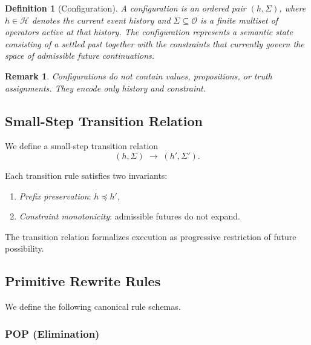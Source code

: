 \documentclass[11pt]{article}
\newtheorem{definition}{Definition}
\newtheorem{remark}{Remark}
\begin{document}
\begin{definition}[Configuration]
A configuration is an ordered pair $(h, \Sigma)$, where $h \in \mathcal{H}$
denotes the current event history and $\Sigma \subseteq \mathcal{O}$ is a finite
multiset of operators active at that history. The configuration represents a
semantic state consisting of a settled past together with the constraints that
currently govern the space of admissible future continuations.
\end{definition}


\begin{remark}
Configurations do not contain values, propositions, or truth assignments. They
encode only history and constraint.
\end{remark}

\subsection{Small-Step Transition Relation}

We define a small-step transition relation
\[
(h, \Sigma) \;\longrightarrow\; (h', \Sigma').
\]

Each transition rule satisfies two invariants:
\begin{enumerate}
\item \emph{Prefix preservation}: $h \preceq h'$,
\item \emph{Constraint monotonicity}: admissible futures do not expand.
\end{enumerate}

The transition relation formalizes execution as progressive restriction of
future possibility.

\subsection{Primitive Rewrite Rules}

We define the following canonical rule schemas.

\subsubsection{POP (Elimination)}
\end{document}
